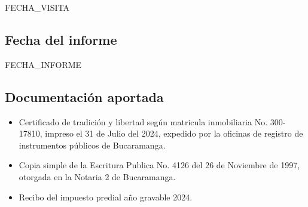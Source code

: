 \documentclass[12pt,a4paper,twoside]{article}
\begin{document}
{FECHA_VISITA%

\subsection{Fecha del informe}

FECHA_INFORME%

\subsection{Documentación aportada}

\begin{itemize}
\item Certificado de tradición y libertad según matricula inmobiliaria No. 300-17810, impreso el 31 de Julio del 2024, expedido por la oficinas de registro de instrumentos públicos de Bucaramanga.
\item Copia simple de la Escritura Publica No. 4126 del 26 de Noviembre de 1997, otorgada en la Notaria 2 de Bucaramanga.
\item Recibo del impuesto predial año gravable 2024.

\end{itemize}



}
\end{document}
